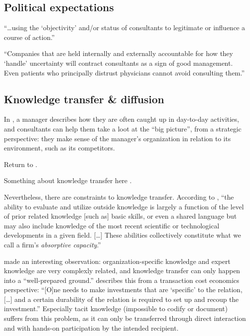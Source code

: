 \documentclass[12pt]{article}
\begin{document}
\hypertarget{political-expectations}{%
\subsection{Political expectations}\label{political-expectations}}

``\ldots using the `objectivity' and/or status of consultants to
legitimate or influence a course of action.'' \citep[ 233]{sturdy1998}

``Companies that are held internally and externally accountable for how
they `handle' uncertainty will contract consultants as a sign of good
management. Even patients who principally distrust physicians cannot
avoid consulting them.'' \citep[70]{kieser2006}

\hypertarget{knowledge-transfer-diffusion}{%
\subsection{Knowledge transfer \&
diffusion}\label{knowledge-transfer-diffusion}}

In \citet[53]{werr2002}, a manager describes how they are often caught
up in day-to-day activities, and consultants can help them take a loot
at the ``big picture'', from a strategic perspective: they make sense of
the manager's organization in relation to its environment, such as its
competitors.

Return to \citet{turner1982}.

Something about knowledge transfer here \citep{sturdy2009}.

Nevertheless, there are constraints to knowledge transfer. According to
\citet[128-129]{cohen1990}, ``the ability to evaluate and utilize
outside knowledge is largely a function of the level of prior related
knowledge {[}such as{]} basic skills, or even a shared language but may
also include knowledge of the most recent scientific or technological
developments in a given field. {[}\ldots{]} These abilities collectively
constitute what we call a firm's \emph{absorptive capacity}.''

\citet[84]{fincham2002} made an interesting observation:
organization-specific knowledge and expert knowledge are very complexly
related, and knowledge transfer can only happen into a ``well-prepared
ground.'' \citet[922]{nooteboom2000} describes this from a transaction
cost economics perspective: ``{[}O{]}ne needs to make investments that
are `specific' to the relation, {[}\ldots{]} and a certain durability of
the relation is required to set up and recoup the investment.''
Especially tacit knowledge (impossible to codify or document) suffers
from this problem, as it can only be transferred through direct
interaction and with hands-on participation by the intended recipient.
\end{document}
